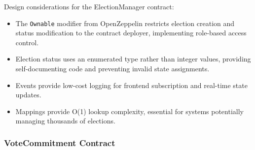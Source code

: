 \documentclass[conference]{IEEEtran}
\begin{document}
Design considerations for the ElectionManager contract:
\begin{itemize}
    \item The \texttt{Ownable} modifier from OpenZeppelin restricts election creation and status modification to the contract deployer, implementing role-based access control.
    \item Election status uses an enumerated type rather than integer values, providing self-documenting code and preventing invalid state assignments.
    \item Events provide low-cost logging for frontend subscription and real-time state updates.
    \item Mappings provide O(1) lookup complexity, essential for systems potentially managing thousands of elections.
\end{itemize}

\subsubsection{VoteCommitment Contract}
\end{document}

